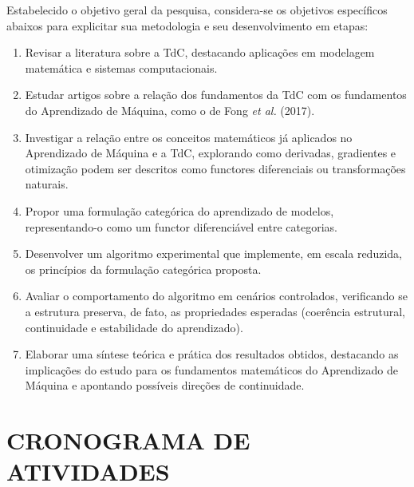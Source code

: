 \documentclass[12pt,a4paper]{article}
\begin{document}
Estabelecido o objetivo geral da pesquisa, considera-se os objetivos específicos abaixos para explicitar sua metodologia e seu desenvolvimento em etapas:

\begin{enumerate} 
    \begin{enumerate} 
        
        \item Revisar a literatura sobre a TdC, destacando aplicações em modelagem matemática e sistemas computacionais.
        
        \item Estudar artigos sobre a relação dos fundamentos da TdC com os fundamentos do Aprendizado de Máquina, como o de Fong \textit{et al.} (2017). 
        
        \item Investigar a relação entre os conceitos matemáticos já aplicados no Aprendizado de Máquina e a TdC, explorando como derivadas, gradientes e otimização podem ser descritos como functores diferenciais ou transformações naturais.
        
        \item Propor uma formulação categórica do aprendizado de modelos, representando-o como um functor diferenciável entre categorias.
        
        \item Desenvolver um algoritmo experimental que implemente, em escala reduzida, os princípios da formulação categórica proposta.
        
        \item Avaliar o comportamento do algoritmo em cenários controlados, verificando se a estrutura preserva, de fato, as propriedades esperadas (coerência estrutural, continuidade e estabilidade do aprendizado).
        
        \item Elaborar uma síntese teórica e prática dos resultados obtidos, destacando as implicações do estudo para os fundamentos matemáticos do Aprendizado de Máquina e apontando possíveis direções de continuidade.
        
    \end{enumerate}
\end{enumerate}

\section{CRONOGRAMA DE ATIVIDADES}
\label{sec:atv}
\end{document}
